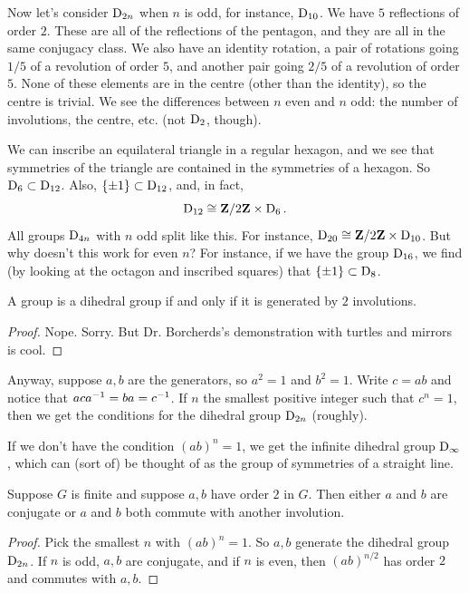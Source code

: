 \documentclass[11pt, oneside]{amsart}
\begin{document}
Now let's consider $\operatorname{D}_{2n}$ when $n$ is odd, for instance, $\operatorname{D}_{10}$.  We have $5$ reflections of order $2$. These are all of the reflections of the pentagon, and they are all in the same conjugacy class. We also have an identity rotation, a pair of rotations going $1/5$ of a revolution of order $5$,  and another pair going $2/5$ of a revolution of order $5$. None of these elements are in the centre (other than the identity), so the centre is trivial. We see the differences between $n$ even and $n$ odd: the number of involutions, the centre, etc. (not $\operatorname{D}_2$, though).

We can inscribe an equilateral triangle in a regular hexagon, and we see that symmetries of the triangle are contained in the symmetries of a hexagon. So $\operatorname{D}_6 \subset \operatorname{D}_{12}$. Also, $\{\pm 1\}\subset \operatorname{D}_{12}$, and, in fact, 
$$
\operatorname{D}_{12} \cong \mathbf Z/2\mathbf Z \times \operatorname{D}_6.
$$ 
All groups $\operatorname{D}_{4n}$ with $n$ odd split like this. For instance, $\operatorname{D}_{20} \cong \mathbf Z/2\mathbf Z\times \operatorname{D}_{10}$. But why doesn't this work for even $n$? For instance, if we have the group $\operatorname{D}_{16}$, we find (by looking at the octagon and inscribed squares) that $\{\pm 1\} \subset \operatorname{D}_8$. 
\begin{proposition}
A group is a dihedral group if and only if it is generated by $2$ involutions. %
\end{proposition}
\begin{proof}
Nope. Sorry. But Dr. Borcherds's demonstration with turtles and mirrors is cool.%
\end{proof}

Anyway, suppose $a,b$ are the generators, so $a^2 = 1$ and $b^2 = 1$. Write $c = ab$ and notice that $aca^{-1} = ba = c^{-1}$. If $n$ the smallest positive integer such that $c^n=1$, then we get the conditions for the dihedral group $\operatorname{D}_{2n}$ (roughly). 

If we don't have the condition $(ab)^n = 1$, we get the infinite dihedral group $\operatorname{D}_\infty$, which can (sort of) be thought of as the group of symmetries of a straight line. 
\begin{proposition}
Suppose $G$ is finite and suppose $a,b$ have order $2$ in $G$. Then either $a$ and $b$ are conjugate or $a$ and $b$ both commute with another involution.
\end{proposition}
\begin{proof}
Pick the smallest $n$ with $(ab)^n = 1$. So $a,b$ generate the dihedral group $\operatorname{D}_{2n}$. If $n$ is odd, $a,b$ are conjugate, and if $n$ is even, then $(ab)^{n/2}$ has order $2$ and commutes with $a,b$.
\end{proof}
\end{document}
